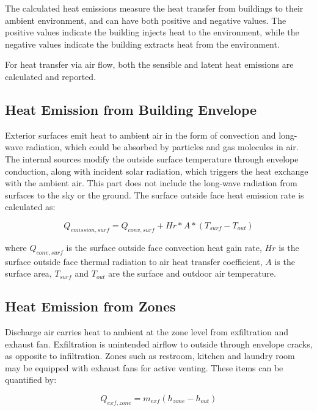 The calculated heat emissions measure the heat transfer from buildings to their ambient environment, and can have both positive and negative values. The positive values indicate the building injects heat to the environment, while the negative values indicate the building extracts heat from the environment.

For heat transfer via air flow, both the sensible and latent heat emissions are calculated and reported.

\subsection{Heat Emission from Building Envelope}\label{emission-from-envelope}

Exterior surfaces emit heat to ambient air in the form of convection and long-wave radiation, which could be absorbed by particles and gas molecules in air. The internal sources modify the outside surface temperature through envelope conduction, along with incident solar radiation, which triggers the heat exchange with the ambient air. This part does not include the long-wave radiation from surfaces to the sky or the ground. The surface outside face heat emission rate is calculated as:

\begin{equation}  \label{eq:he-1}
Q_{emission, surf} = Q_{conv, surf} +  Hr * A * (T_{surf} - T_{out})
\end{equation}

where \(Q_{conv, surf}\) is the surface outside face convection heat gain rate, \(Hr\) is the surface outside face thermal radiation to air heat transfer coefficient, \(A\) is the surface area, \(T_{surf}\) and \(T_{out}\) are the surface and outdoor air temperature.

\subsection{Heat Emission from Zones}\label{emission-from-zones}

Discharge air carries heat to ambient at the zone level from exfiltration and exhaust fan. Exfiltration is unintended airflow to outside through envelope cracks, as opposite to infiltration. Zones such as restroom, kitchen and laundry room may be equipped with exhaust fans for active venting. These items can be quantified by:

\begin{equation}  \label{eq:he-2}
Q_{exf, zone} = m_{exf}(h_{zone} - h_{out})
\end{equation}

